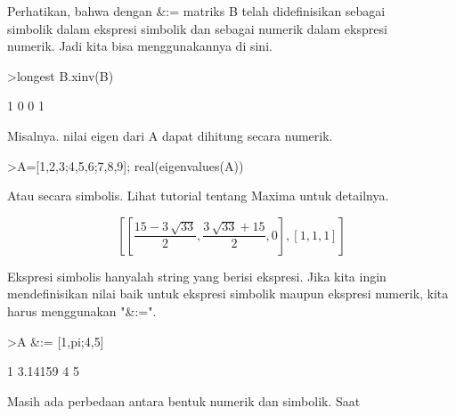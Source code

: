 \documentclass[a4paper,10pt]{article}
\begin{document}
\begin{eulernotebook}
\begin{eulercomment}
\begin{eulercomment}
\begin{eulercomment}
\begin{eulercomment}
\begin{eulercomment}
Perhatikan, bahwa dengan \&:= matriks B telah didefinisikan sebagai\\
simbolik dalam ekspresi simbolik dan sebagai numerik dalam ekspresi\\
numerik. Jadi kita bisa menggunakannya di sini.
\end{eulercomment}
\begin{eulerprompt}
>longest B.xinv(B)
\end{eulerprompt}
\begin{euleroutput}
                        1                       0 
                        0                       1 
\end{euleroutput}
\begin{eulercomment}
Misalnya. nilai eigen dari A dapat dihitung secara numerik.
\end{eulercomment}
\begin{eulerprompt}
>A=[1,2,3;4,5,6;7,8,9]; real(eigenvalues(A))
\end{eulerprompt}
\begin{euleroutput}
  [16.1168,  -1.11684,  0]
\end{euleroutput}
\begin{eulercomment}
Atau secara simbolis. Lihat tutorial tentang Maxima untuk detailnya.
\end{eulercomment}
\begin{eulerformula}
\[
\left[ \left[ \frac{15-3\,\sqrt{33}}{2} , \frac{3\,\sqrt{33}+15}{2}   , 0 \right]  , \left[ 1 , 1 , 1 \right]  \right] 
\]
\end{eulerformula}
\begin{eulercomment}
\begin{eulercomment}
\begin{eulercomment}
Ekspresi simbolis hanyalah string yang berisi ekspresi. Jika kita
ingin mendefinisikan nilai baik untuk ekspresi simbolik maupun
ekspresi numerik, kita harus menggunakan "\&:=".
\end{eulercomment}
\begin{eulerprompt}
>A &:= [1,pi;4,5]
\end{eulerprompt}
\begin{euleroutput}
              1       3.14159 
              4             5 
\end{euleroutput}
\begin{eulercomment}
Masih ada perbedaan antara bentuk numerik dan simbolik. Saat\\

\end{eulercomment}
\end{eulercomment}
\end{eulercomment}
\end{eulercomment}
\end{eulercomment}
\end{eulercomment}
\end{eulercomment}
\end{eulernotebook}
\end{document}
